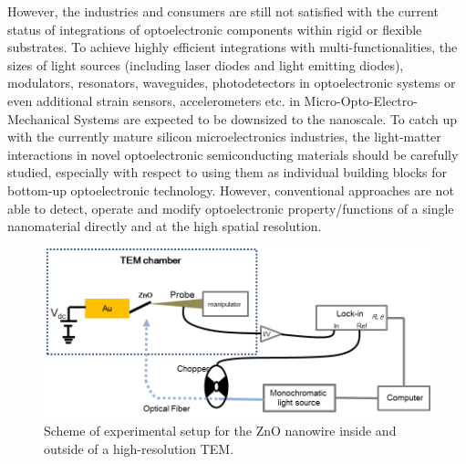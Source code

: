 However, the industries and consumers are still not satisfied with the current status of integrations of optoelectronic components within rigid or flexible substrates.\cite{C.2009, T.2004, D.2004}
To achieve highly efficient integrations with multi-functionalities, the sizes of light sources (including laser diodes and light emitting diodes), modulators, resonators, waveguides, photodetectors in optoelectronic systems or even additional strain sensors, accelerometers etc. in Micro-Opto-Electro-Mechanical Systems are expected to be downsized to the nanoscale.\cite{Park2007} 
To catch up with the currently mature silicon microelectronics industries, the light-matter interactions in novel optoelectronic semiconducting materials should be carefully studied, especially with respect to using them as individual building blocks for bottom-up optoelectronic technology. 
However, conventional approaches are not able to detect, operate and modify optoelectronic property/functions of a single nanomaterial directly and at the high spatial resolution. 

\begin{figure}  
\includegraphics[width=\textwidth]{figures/figure5_1}
\caption[Experimental setup for Zinc Oxide.]{Scheme of experimental setup for the ZnO nanowire inside and outside of a high-resolution TEM.
\label{fig:5_1}}
\end{figure}

